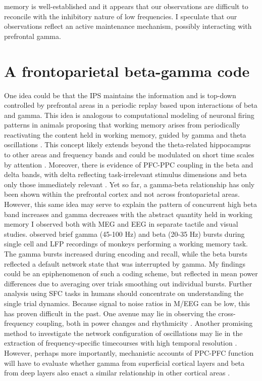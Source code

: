 memory is well-established and it appears that our observations are difficult to reconcile with the inhibitory nature of low frequencies. I speculate that our observations reflect an active maintenance mechanism, possibly interacting with prefrontal gamma.

\section{A frontoparietal beta-gamma code}
One idea could be that the IPS maintains the information and is top-down controlled by prefrontal areas in a periodic replay based upon interactions of beta and gamma. This idea is analogous to computational modeling of neuronal firing patterns in animals proposing that working memory arises from periodically reactivating the content held in working memory, guided by gamma and theta oscillations \parencite{Fuentemilla2010,Jensen2005,Lisman1999,Lisman1995}. This concept likely extends beyond the theta-related hippocampus to other areas and frequency bands \parencite{Lundqvist2016,Mongillo2008} and could be modulated on short time scales by attention \parencite{Awh1998}. Moreover, there is evidence of PFC-PPC coupling in the beta and delta bands, with delta reflecting task-irrelevant stimulus dimensions and beta only those immediately relevant \parencite{Antzoulatos2016}. Yet so far, a gamma-beta relationship has only been shown within the prefrontal cortex \parencite{Lundqvist2016} and not across frontoparietal areas. 
However, this same idea may serve to explain the pattern of concurrent high beta band increases and gamma decreases with the abstract quantity held in working memory I observed both with MEG and EEG in separate tactile and visual studies. \textcite{Lundqvist2016} observed brief gamma (45-100 Hz) and beta (20-35 Hz) bursts during single cell and LFP recordings of monkeys performing a working memory task. The gamma bursts increased during encoding and recall, while the beta bursts reflected a default network state that was interrupted by gamma. My findings could be an epiphenomenon of such a coding scheme, but reflected in mean power differences due to averaging over trials smoothing out individual bursts. Further analysis using SFC tasks in humans should concentrate on understanding the single trial dynamics. Because signal to noise ratios in M/EEG can be low, this has proven difficult in the past. One avenue may lie in observing the cross-frequency coupling, both in power changes and rhythmicity \parencite{Fransen2015}. Another promising method to investigate the network configuration of oscillations may lie in the extraction of frequency-specific timecourses
with high temporal resolution \parencite{Vidaurre2016,Vidaurre2018}. However, perhaps more importantly, mechanistic accounts of PPC-PFC function will have to evaluate whether gamma from superficial cortical layers and beta from deep layers also enact a similar relationship in other cortical areas \parencite{Miller2018,Christophel2017}.

